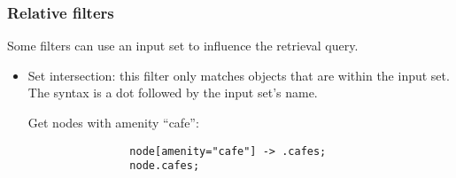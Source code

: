\documentclass[main.tex]{subfiles}
\begin{document}
\subsubsection{Relative filters}
Some filters can use an input set to influence the retrieval query.
\begin{itemize}
    \item Set intersection: this filter only matches objects that are within
        the input set. The syntax is a dot followed by the input set's name.
        \begin{mexample}
            Get nodes with amenity ``cafe'':
            \begin{lstwrap}\begin{lstlisting}
                node[amenity="cafe"] -> .cafes;
                node.cafes;
            \end{lstlisting}\end{lstwrap}


\end{mexample}
\end{itemize}
\end{document}
